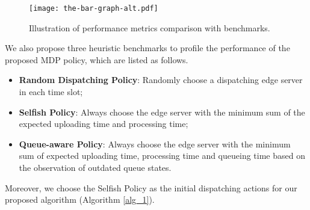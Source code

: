 \begin{figure}[ht]                                                      %
    \centering                                                          %
    \texttt{[image: the-bar-graph-alt.pdf]}               %
    \caption{Illustration of performance metrics comparison with benchmarks.}
    \label{fig:bar_plot}                                                %
\end{figure}                                                            %

We also propose {three heuristic benchmarks to profile the performance of the proposed MDP policy}, which are listed as follows.
\begin{itemize}
    \item \textbf{Random Dispatching Policy}:
            Randomly choose a dispatching edge server in each time slot; 
    \item \textbf{Selfish Policy}:
            Always choose the edge server with the minimum sum of the expected uploading time and processing time;
    \item \textbf{Queue-aware Policy}:
            Always choose the edge server with the minimum sum of expected uploading time, processing time and queueing time based on the observation of outdated queue states.
\end{itemize}
Moreover, we choose the Selfish Policy as the initial dispatching actions for our proposed algorithm (Algorithm \ref{alg_1}).

